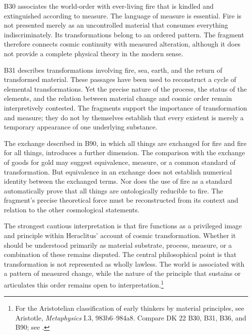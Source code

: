 \label{para:VS.B01.P01.C08.S03.SS05.P002}

B30 associates the world-order with ever-living fire
that is kindled and extinguished according to measure.
The language of measure is essential. Fire is not
presented merely as an uncontrolled material that
consumes everything indiscriminately. Its transformations
belong to an ordered pattern. The fragment therefore
connects cosmic continuity with measured alteration,
although it does not provide a complete physical
theory in the modern sense.

\label{para:VS.B01.P01.C08.S03.SS05.P003}

B31 describes transformations involving fire, sea,
earth, and the return of transformed material. These
passages have been used to reconstruct a cycle of
elemental transformations. Yet the precise nature
of the process, the status of the elements, and
the relation between material change and cosmic
order remain interpretively contested. The fragments
support the importance of transformation and measure;
they do not by themselves establish that every existent
is merely a temporary appearance of one underlying
substance.

\label{para:VS.B01.P01.C08.S03.SS05.P004}

The exchange described in B90, in which all things
are exchanged for fire and fire for all things,
introduces a further dimension. The comparison with
the exchange of goods for gold may suggest equivalence,
measure, or a common standard of transformation.
But equivalence in an exchange does not establish
numerical identity between the exchanged terms.
Nor does the use of fire as a standard automatically
prove that all things are ontologically reducible
to fire. The fragment's precise theoretical force
must be reconstructed from its context and relation
to the other cosmological statements.

\label{para:VS.B01.P01.C08.S03.SS05.P005}

The strongest cautious interpretation is that fire
functions as a privileged image and principle within
Heraclitus' account of cosmic transformation. Whether
it should be understood primarily as material
substrate, process, measure, or a combination of
these remains disputed. The central philosophical
point is that transformation is not represented
as wholly lawless. The world is associated with
a pattern of measured change, while the nature
of the principle that sustains or articulates this
order remains open to interpretation.\footnote{For
the Aristotelian classification of early thinkers
by material principles, see Aristotle, \textit{Metaphysics}
I.3, 983b6--984a8. Compare DK 22 B30, B31, B36,
and B90; see \cite{AristotleMetaphysics,
HeraclitusFragments,KirkHeraclitus1954,
GrahamTextsEarlyGreek2010,GrahamHeraclitusSEP2023}.}

